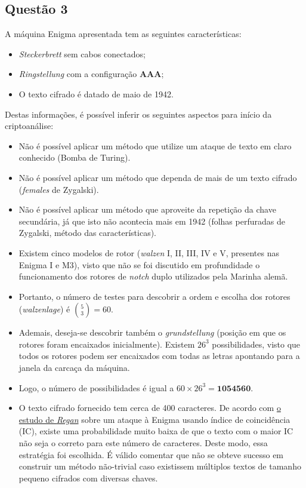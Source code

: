 \documentclass{article}
\begin{document}
\subsection*{Questão 3}
A máquina Enigma apresentada tem as seguintes características:
\begin{itemize}
    \item \textit{Steckerbrett} sem cabos conectados;
    \item \textit{Ringstellung} com a configuração \textbf{AAA};
    \item O texto cifrado é datado de maio de 1942.
\end{itemize}
Destas informações, é possível inferir os seguintes aspectos para início da criptoanálise:
\begin{itemize}
    \item Não é possível aplicar um método que utilize um ataque de texto em claro conhecido (Bomba de Turing).
    \item Não é possível aplicar um método que dependa de mais de um texto cifrado (\textit{females} de Zygalski).
    \item Não é possível aplicar um método que aproveite da repetição da chave secundária, já que isto não acontecia mais em 1942 (folhas perfuradas de Zygalski, método das características).
    \item Existem cinco modelos de rotor (\textit{walzen} I, II, III, IV e V, presentes nas Enigma I e M3), visto que não se foi discutido em profundidade o funcionamento dos rotores de \textit{notch} duplo utilizados pela Marinha alemã.
    \item Portanto, o número de testes para descobrir a ordem e escolha dos rotores (\textit{walzenlage}) é $\binom{5}{3} = 60$.
    \item Ademais, deseja-se descobrir também o \textit{grundstellung} (posição em que os rotores foram encaixados inicialmente). Existem $26^3$ possibilidades, visto que todos os rotores podem ser encaixados com todas as letras apontando para a janela da carcaça da máquina.
    \item Logo, o número de possibilidades é igual a $60 \times 26^3 = \textbf{1054560}$.
    \item O texto cifrado fornecido tem cerca de 400 caracteres. De acordo com \href{http://www.cs.rochester.edu/u/brown/Crypto/studprojs/Enigma.html}{o estudo de \textit{Regan}} sobre um ataque à Enigma usando índice de coincidência (IC), existe uma probabilidade muito baixa de que o texto com o maior IC não seja o correto para este número de caracteres. Deste modo, essa estratégia foi escolhida. É válido comentar que não se obteve sucesso em construir um método não-trivial caso existissem múltiplos textos de tamanho pequeno cifrados com diversas chaves.
\end{itemize}
\end{document}
